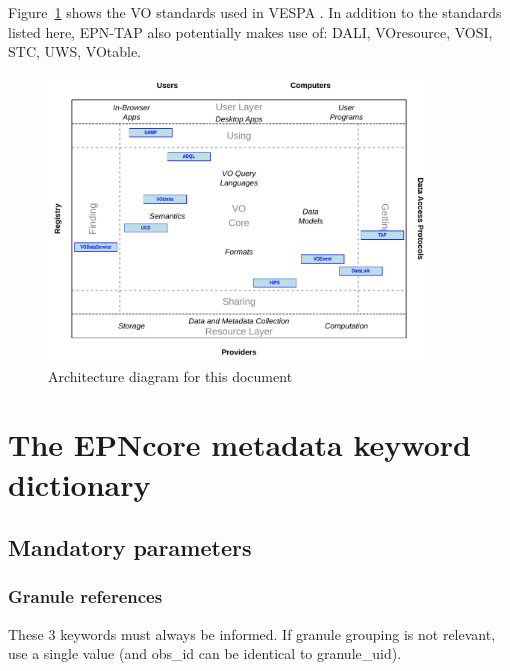 \documentclass[11pt,a4paper]{ivoa}
\begin{document}
Figure~\ref{fig:archdiag} shows the VO standards used in VESPA \citep{note:VOARCH}.
In addition to the standards listed here, EPN-TAP also potentially makes use of: DALI, VOresource, VOSI, STC, UWS, VOtable. 



\begin{figure}[thb]
\centering

\includegraphics[width=0.9\textwidth]{role_diagram.pdf}
\caption{Architecture diagram for this document}
\label{fig:archdiag}
\end{figure}

\clearpage %

\section{The EPNcore metadata keyword dictionary} 


\subsection{Mandatory parameters}

\subsubsection{Granule references}

These 3 keywords must always be informed. If granule grouping is not relevant, use a single value (and obs\_id can be identical to granule\_uid).
\end{document}
